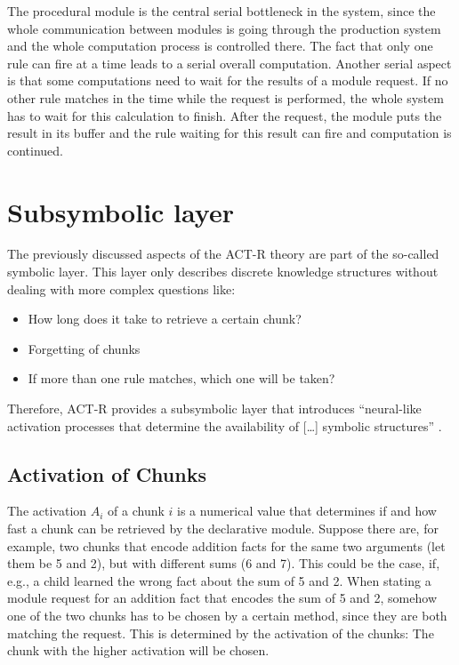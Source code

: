 The procedural module is the central serial bottleneck in the system, since the whole communication between modules is going through the production system and the whole computation process is controlled there. The fact that only one rule can fire at a time leads to a serial overall computation. Another serial aspect is that some computations need to wait for the results of a module request. If no other rule matches in the time while the request is performed, the whole system has to wait for this calculation to finish. After the request, the module puts the result in its buffer and the rule waiting for this result can fire and computation is continued.

\section{Subsymbolic layer}
\label{subsymbolic_layer}

The previously discussed aspects of the ACT-R theory are part of the so-called symbolic layer. This layer only describes discrete knowledge structures without dealing with more complex questions like: 

\begin{itemize}
\item How long does it take to retrieve a certain chunk? 
\item Forgetting of chunks
\item If more than one rule matches, which one will be taken?
\end{itemize}

Therefore, ACT-R provides a subsymbolic layer that introduces ``neural-like activation processes that determine the availability of [\dots] symbolic structures'' \cite{anderson_implications_2000}.

\subsection{Activation of Chunks}
\label{activation}

The activation $A_i$ of a chunk $i$ is a numerical value that determines if and how fast a chunk can be retrieved by the declarative module. Suppose there are, for example, two chunks that encode addition facts for the same two arguments (let them be 5 and 2), but with different sums (6 and 7). This could be the case, if, e.g., a child learned the wrong fact about the sum of 5 and 2. When stating a module request for an addition fact that encodes the sum of 5 and 2, somehow one of the two chunks has to be chosen by a certain method, since they are both matching the request. This is determined by the activation of the chunks: The chunk with the higher activation will be chosen.

